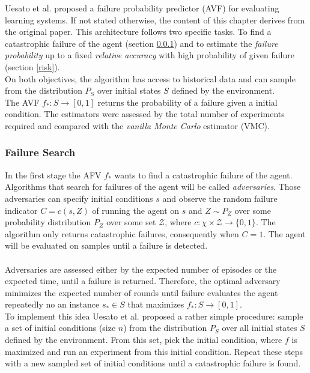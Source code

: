 Uesato et al. \cite{uesato18} proposed a failure probability predictor (AVF) for evaluating learning systems. If not stated otherwise, the content of this chapter derives from the original paper. This architecture follows two specific tasks. To find a catastrophic failure of the agent (section \ref{failure}) and to estimate the \textit{failure probability} up to a fixed \textit{relative accuracy} with high probability of given failure (section \ref{risk}).\\
On both objectives, the algorithm has access to historical data and can sample from the distribution $P_S$ over initial states $S$ defined by the environment.\\
The AVF $f_*:S \rightarrow [0,1]$ returns the probability of a failure given a initial condition. The estimators were assessed by the total number of experiments required and compared with the \textit{vanilla Monte Carlo} estimator (VMC).

\subsubsection{Failure Search}
\label{failure}

In the first stage the AFV $f_*$ wants to find a catastrophic failure of the agent. Algorithms that search for failures of the agent will be called \textit{adversaries}. Those adversaries can specify initial conditions $s$ and observe the random failure indicator $C = c(s,Z)$ of running the agent on $s$ and $Z \sim P_Z$ over some probability distribution $P_Z$ over some set $\mathcal{Z}$, where $c: \chi \times \mathcal{Z} \rightarrow \{0,1\}$. The algorithm only returns catastrophic failures, consequently when $C = 1$. The agent will be evaluated on samples until a failure is detected.\\\\
Adversaries are assessed either by the expected number of episodes or the expected time, until a failure is returned. Therefore, the optimal adversary minimizes the expected number of rounds until failure evaluates the agent repeatedly no an instance $s_* \in S$ that maximizes $f_* : S \rightarrow [0,1]$.\\
To implement this idea Uesato et al. \cite{uesato18} proposed a rather simple procedure: sample a set of initial conditions (size $n$) from the distribution $P_S$ over all initial states $S$ defined by the environment. From this set, pick the initial condition, where $f$ is maximized and run an experiment from this initial condition. Repeat these steps with a new sampled set of initial conditions until a catastrophic failure is found. 


